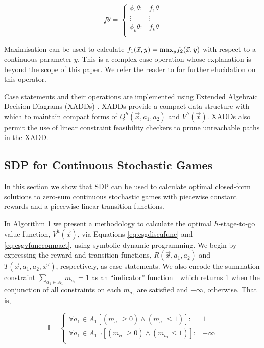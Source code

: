 {\small 
\begin{equation*}
  f\theta = 
    \begin{cases}
      \phi_1\theta: & f_1\theta \\ 
      \vdots & \vdots\\ 
      \phi_k\theta: & f_k\theta \\ 
    \end{cases} \nonumber
\end{equation*}
}%

Maximisation can be used to calculate $f_1(\vec{x}, y) = \mathrm{max}_{y}f_2(\vec{x}, y) $
with respect to a continuous parameter $y$. This is a complex case operation
whose explanation is beyond the scope of this paper. We refer the reader to 
\cite{Zamani_AAAI_2012} for further elucidation on this operator.

Case statements and their operations are implemented using Extended 
Algebraic Decision Diagrams (XADDs) \cite{Sanner_UAI_2011}.
XADDs provide a compact data structure with which to maintain
compact forms of $Q^{h}(\vec{x}, a_1, a_2)$ and $V^{h}(\vec{x})$. 
XADDs also permit the use of linear constraint feasibility checkers to 
prune unreachable paths in the XADD.

\subsection{SDP for Continuous Stochastic Games}

In this section we show that SDP can be used to calculate optimal closed-form
solutions to zero-sum continuous stochastic games with piecewise
constant rewards and a piecewise linear transition functions. 

In Algorithm 1 we present a methodology to calculate the optimal 
$h$-stage-to-go value function, $V^h(\vec{x})$, via Equations
\eqref{eq:csgdiscqfunc} and \eqref{eq:csgvfunccompact}, using symbolic
dynamic programming. We begin by expressing the reward and transition
functions, $R(\vec{x}, a_1, a_2)$ and $T(\vec{x}, a_1, a_2, \vec{x}')$, respectively, as case statements. We also encode the summation constraint $\sum_{a_{1} \in A_1} m_{a_{1}} = 1$
as an ``indicator'' function $\mathbb{I}$  which returns 1 when the 
conjunction of all constraints on each $m_{a_1}$ are satisfied
and $-\infty$, otherwise. That is, 

{\small 
\begin{equation*}
  \mathbb{I} = 
    \begin{cases}
      \forall a_{1} \in A_1 \left[(m_{a_{1}} \geq 0) \wedge (m_{a_{1}} \leq 1 ) \right]: & 1 \\ 
      \forall a_{1} \in A_1 \neg \left[(m_{a_{1}} \geq 0) \wedge (m_{a_{1}} \leq 1 ) \right]: & -\infty \\ 
    \end{cases} \nonumber
\end{equation*}
}%

